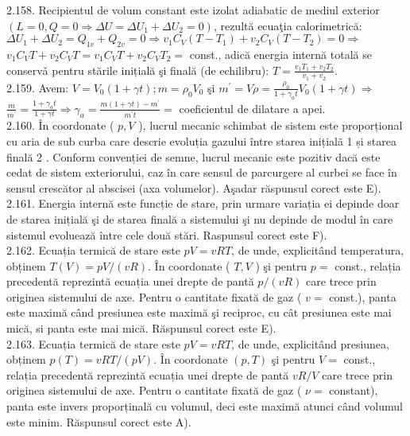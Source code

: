 2.158. Recipientul de volum constant este izolat adiabatic de mediul exterior $\left(L=0, Q=0 \Rightarrow \Delta U=\Delta U_{1}+\Delta U_{2}=0\right)$, rezultă ecuaţia calorimetrică:\\
$\Delta U_{1}+\Delta U_{2}=Q_{1 v}+Q_{2 v}=0 \Rightarrow v_{1} C_{V}\left(T-T_{1}\right)+v_{2} C_{V}\left(T-T_{2}\right)=0 \Rightarrow$\\
$v_{1} C_{V} T+v_{2} C_{V} T=v_{1} C_{V} T+v_{2} C_{V} T_{2}=$ const., adică energia internă totală se conservǎ pentru stările inițială şi finală (de echilibru): $T=\frac{v_{1} T_{1}+v_{2} T_{2}}{v_{1}+v_{2}}$.\\
2.159. Avem: $V=V_{0}(1+\gamma t) ; m=\rho_{0} V_{0}$ şi $m^{\prime}=V \rho=\frac{\rho_{0}}{1+\gamma_{a} t} V_{0}(1+\gamma t) \Rightarrow$ $\frac{m}{m^{\prime}}=\frac{1+\gamma_{a} t}{1+\gamma t} \Rightarrow \gamma_{a}=\frac{m(1+\gamma t)-m^{\prime}}{m^{\prime} t}=$ coeficientul de dilatare a apei.\\
2.160. În coordonate ( $p, V$ ), lucrul mecanic schimbat de sistem este proporțional cu aria de sub curba care descrie evoluția gazului între starea inițialã 1 și starea finală 2 . Conform convenției de semne, lucrul mecanic este pozitiv dacă este cedat de sistem exteriorului, caz în care sensul de parcurgere al curbei se face în sensul crescător al abscisei (axa volumelor). Aşadar răspunsul corect este E).\\
2.161. Energia internă este funcție de stare, prin urmare variația ei depinde doar de starea inițială şi de starea finală a sistemului şi nu depinde de modul în care sistemul evoluează între cele două stări. Raspunsul corect este F).\\
2.162. Ecuația termică de stare este $p V=v R T$, de unde, explicitând temperatura, obținem $T(V)=p V /(v R)$. În coordonate ( $T, V$ ) şi pentru $p=$ const., relația precedentă reprezintă ecuația unei drepte de pantă $p /(v R)$ care trece prin originea sistemului de axe. Pentru o cantitate fixată de gaz ( $v=$ const.), panta este maximă când presiunea este maximă şi reciproc, cu cât presiunea este mai mică, si panta este mai mică. Răspunsul corect este E).\\
2.163. Ecuația termică de stare este $p V=v R T$, de unde, explicitând presiunea, obținem $p(T)=v R T /(p V)$. În coordonate $(p, T)$ şi pentru $V=$ const., relația precedentă reprezintă ecuația unei drepte de pantă $v R / V$ care trece prin originea sistemului de axe. Pentru o cantitate fixată de gaz ( $\nu=$ constant), panta este invers proporținală cu volumul, deci este maximă atunci când volumul este minim. Răspunsul corect este A).\\
